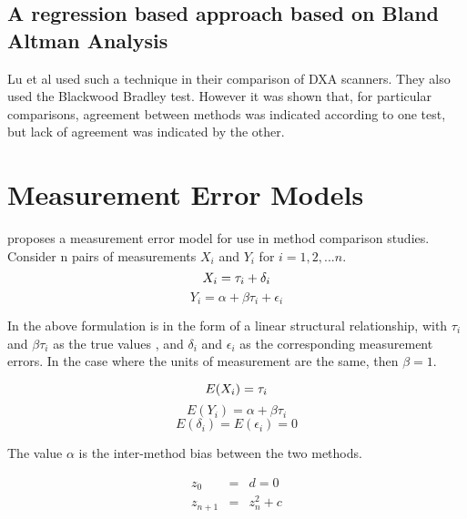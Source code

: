 \documentclass[12pt, a4paper]{report}
\begin{document}
\subsection{A regression based approach based on Bland Altman Analysis}
Lu et al used such a technique in their comparison of DXA
scanners. They also used the Blackwood Bradley test. However it
was shown that, for particular comparisons,  agreement between
methods was indicated according to one test, but lack of agreement
was indicated by the other.


\section{Measurement Error Models}
\citet{DunnSEME} proposes a measurement error model for use in
method comparison studies. Consider n pairs of measurements
$X_{i}$ and $Y_{i}$ for $i=1,2,...n$.
\begin{equation}
X_{i} = \tau_{i}+\delta_{i}\\
\end{equation}
\begin{equation}
 Y_{i} = \alpha +\beta\tau_{i}+\epsilon_{i} \nonumber
\end{equation}

In the above formulation is in the form of a linear structural
relationship, with $\tau_{i}$ and $\beta\tau_{i}$ as the true
values , and $\delta_{i}$ and $\epsilon_{i}$ as the corresponding
measurement errors. In the case where the units of measurement are
the same, then $\beta =1$.

\begin{equation}
E(X_{i}) = \tau_{i}\\
\end{equation}
\begin{equation}
E(Y_{i}) = \alpha +\beta\tau_{i} \nonumber
\end{equation}
\begin{equation}
E(\delta_{i}) = E(\epsilon_{i}) = 0 \nonumber
\end{equation}

The value $\alpha$ is the inter-method bias between the two
methods.

\begin{eqnarray}
  z_0 &=& d = 0 \\
  z_{n+1} &=& z_n^2+c
\end{eqnarray}






\end{document}
